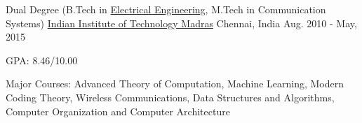 \begin{cventries}
	\cventry
	{Dual Degree (B.Tech in \href{http://www.ee.iitm.ac.in/}{Electrical Engineering}, M.Tech in Communication Systems)}
	{\href{https://www.iitm.ac.in/}{Indian Institute of Technology Madras}}
	{Chennai, India}
	{Aug. 2010 - May, 2015}
	{
		\begin{cvitems}
		\item{GPA: 8.46/10.00}
		\item{Major Courses: Advanced Theory of Computation, Machine Learning, Modern Coding Theory, Wireless Communications, Data Structures and Algorithms, Computer Organization and Computer Architecture}
		\end{cvitems}
	}

\end{cventries}
